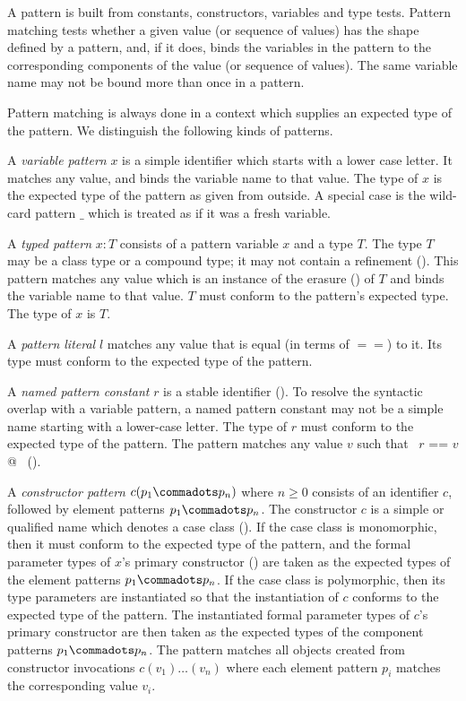 
A pattern is built from constants, constructors, variables and type
tests. Pattern matching tests whether a given value (or sequence of values)
has the shape defined by a pattern, and, if it does, binds the
variables in the pattern to the corresponding components of the value
(or sequence of values).  The same variable name may not be bound more
than once in a pattern.

Pattern matching is always done in a context which supplies an
expected type of the pattern. We distinguish the following kinds of
patterns.

A {\em variable pattern} $x$ is a simple identifier which starts with
a lower case letter.  It matches any value, and binds the variable
name to that value.  The type of $x$ is the expected type of the
pattern as given from outside.  A special case is the wild-card
pattern $\_$ which is treated as if it was a fresh variable.

A {\em typed pattern} $x: T$ consists of a pattern variable $x$ and a
type $T$. The type $T$ may be a class type or a compound type; it may
not contain a refinement ().  This pattern
matches any value which is an instance of the erasure
() of $T$ and binds the variable name to that value.
$T$ must conform to the pattern's expected type. The type of $x$ is
$T$.

A {\em pattern literal} $l$ matches any value that is equal (in terms
of $==$) to it. Its type must conform to the expected type of the
pattern. 

A {\em named pattern constant} $r$ is a stable identifier
(). To resolve the syntactic overlap with a
variable pattern, a named pattern constant may not be a simple name
starting with a lower-case letter. The type of $r$ must conform
to the expected type of the pattern. The pattern matches any value $v$
such that ~\lstinline@$r$ == $v$@~ ().

A {\em constructor pattern} $c(p_1 \commadots p_n)$ where $n \geq 0$
consists of an identifier $c$, followed by element patterns $p_1
\commadots p_n$. The constructor $c$ is a simple or qualified name
which denotes a case class (). If the case
class is monomorphic, then it must conform to the expected type of the
pattern, and the formal parameter types of $x$'s primary constructor
() are taken as the expected types of the element
patterns $p_1\commadots p_n$.  If the case class is polymorphic, then
its type parameters are instantiated so that the instantiation of $c$
conforms to the expected type of the pattern. The instantiated formal
parameter types of $c$'s primary constructor are then taken as the
expected types of the component patterns $p_1\commadots p_n$.  The
pattern matches all objects created from constructor invocations
$c(v_1)\ldots(v_n)$ where each element pattern $p_i$ matches the
corresponding value $v_i$.

